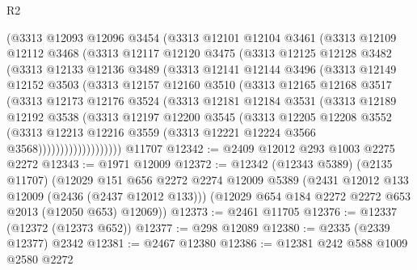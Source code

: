 \begin{lexlean}{R2}
\begin{coremodule}
        (@3313
          @12093
          @12096
          @3454
          (@3313
            @12101
            @12104
            @3461
            (@3313
              @12109
              @12112
              @3468
              (@3313
                @12117
                @12120
                @3475
                (@3313
                  @12125
                  @12128
                  @3482
                  (@3313
                    @12133
                    @12136
                    @3489
                    (@3313
                      @12141
                      @12144
                      @3496
                      (@3313
                        @12149
                        @12152
                        @3503
                        (@3313
                          @12157
                          @12160
                          @3510
                          (@3313
                            @12165
                            @12168
                            @3517
                            (@3313
                              @12173
                              @12176
                              @3524
                              (@3313
                                @12181
                                @12184
                                @3531
                                (@3313
                                  @12189
                                  @12192
                                  @3538
                                  (@3313
                                    @12197
                                    @12200
                                    @3545
                                    (@3313
                                      @12205
                                      @12208
                                      @3552
                                      (@3313
                                        @12213
                                        @12216
                                        @3559
                                        (@3313 @12221 @12224 @3566 @3568)))))))))))))))))))
    @11707
@12342 := @2409 @12012 @293 @1003 @2275 @2272
@12343 := @1971 @12009
@12372 := @12342
    (@12343 @5389)
    (@2135 @11707)
    (@12029
      @151
      @656
      @2272
      @2274
      @12009
      @5389
      (@2431 @12012 @133 @12009 (@2436 (@2437 @12012 @133)))
      (@12029 @654 @184 @2272 @2272 @653 @2013 (@12050 @653) @12069))
@12373 := @2461 @11705
@12376 := @12337 (@12372 (@12373 @652))
@12377 := @298 @12089
@12380 := @2335 (@2339 @12377) @2342
@12381 := @2467 @12380
@12386 := @12381 @242 @588 @1009 @2580 @2272

\end{coremodule}
\end{lexlean}
